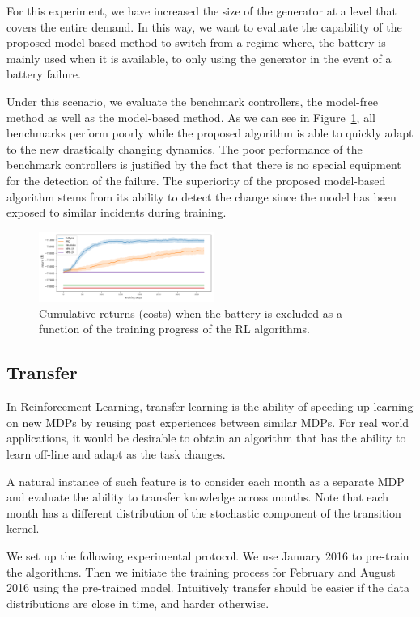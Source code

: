 \documentclass{article}
\begin{document}
For this experiment, we have increased the size of the generator at a level that covers the entire demand. In this way, we want to evaluate the capability of the proposed model-based method to switch from a regime where, the battery is mainly used when it is available, to only using the generator in the event of a battery failure.

Under this scenario, we evaluate the benchmark controllers, the model-free method as well as the model-based method. As we can see in Figure~\ref{fig:change}, all benchmarks perform poorly while the proposed algorithm is able to quickly adapt to the new drastically changing dynamics. The poor performance of the benchmark controllers is justified by the fact that there is no special equipment for the detection of the failure. The superiority of the proposed model-based algorithm stems from its ability to detect the change since the model has been exposed to similar incidents during training.

    
    \begin{figure}[t]
    	\includegraphics[width=0.51\textwidth]{robustness.png}
    	\centering
    	\caption{Cumulative returns (costs) when the battery is excluded as a function of the training progress of the RL algorithms.}
		\label{fig:change}
    \end{figure}
    

\subsection{Transfer}

    In Reinforcement Learning, transfer learning is the ability of speeding up learning on new MDPs by reusing past experiences between similar MDPs. For real world applications, it would be desirable to obtain an algorithm that has the ability to learn off-line and adapt as the task changes. 

    A natural instance of such feature is to consider each month as a separate MDP and evaluate the ability to transfer knowledge across months. Note that each month has a different distribution of the stochastic component of the transition kernel.
    
	We set up the following experimental protocol. We use January 2016 to pre-train the algorithms. Then we initiate the training process for February and August 2016 using the pre-trained model. Intuitively transfer should be easier if the data distributions are close in time, and harder otherwise.
	
\end{document}
